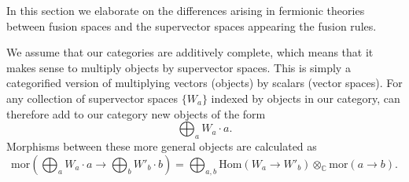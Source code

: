 \documentclass[12pt,a4paper]{article}
\newcommand{\tp}{\otimes}
\newcommand{\cc}{\mathbb{C}}
\newcommand\be            {\begin{equation}}
\newcommand\ee            {\end{equation}}
\newcommand{\Hom}{\text{Hom}}
\newcommand{\mor}{\text{mor}}
\newcommand{\End}{\text{End}}
\newcommand{\dave}[1]{{\color{ao(english)}\footnotesize{(DA) #1}}}
\newcommand{\kw}[1]{{\color{kwcolor}\footnotesize{(KW) #1}}}
\begin{document}

In this section we elaborate on the differences arising in fermionic theories between fusion spaces and the supervector spaces appearing the fusion rules. 

We assume that our categories are additively complete, which means that it makes sense to
multiply objects by supervector spaces. 
This is simply a categorified version of multiplying vectors (objects) by scalars (vector spaces).
For any collection of supervector spaces $\{W_a\}$ indexed by objects in our category, can therefore add to our category new objects of the form
\be \bigoplus_a W_a \cdot a.\ee
Morphisms between these more general objects are calculated as  
\be
	\mor(\bigoplus_a W_a\cdot a \to \bigoplus_b W'_b\cdot b) = \bigoplus_{a,b} \Hom(W_a \to W'_b)\otimes_\cc \mor(a\to b) .
\ee
\end{document}
